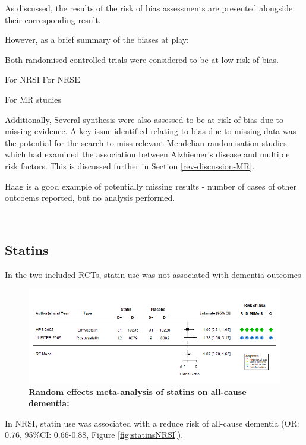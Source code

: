 \documentclass[a4paper, twoside]{templates/ociamthesis}
\begin{document}
As discussed, the results of the risk of bias assessments are presented alongside their corresponding result.

However, as a brief summary of the biases at play:

Both randomised controlled trials were considered to be at low risk of bias.

For NRSI
For NRSE

For MR studies

Additionally, Several synthesis were also assessed to be at risk of bias due to missing evidence. A key issue identified relating to bias due to missing data was the potential for the search to miss relevant Mendelian randomisation studies which had examined the association between Alzhiemer's disease and multiple risk factors. This is discussed further in Section \ref{rev-discussion-MR}.

Haag is a good example of potentially missing results - number of cases of other outcoems reported, but no analysis performed.

~

\hypertarget{statins}{%
\subsection{Statins}\label{statins}}

In the two included RCTs, statin use was not associated with dementia outcomes





\begin{figure}[H]
\includegraphics[width=1\linewidth]{figures/sys-rev/forest_statins_rct} \caption[Random effects meta-analysis of statins on all-cause dementia]{\textbf{Random effects meta-analysis of statins on all-cause dementia:}}\label{fig:statinsRCT}
\end{figure}

In NRSI, statin use was associated with a reduce risk of all-cause dementia (OR: 0.76, 95\%CI: 0.66-0.88, Figure \ref{fig:statinsNRSI}).
\end{document}
